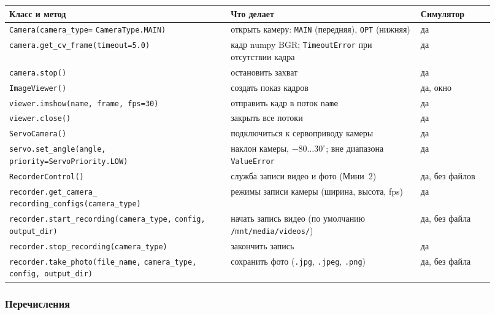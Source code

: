 {\footnotesize
\begin{longtable}{@{}>{\raggedright\arraybackslash}p{0.42\linewidth}>{\raggedright\arraybackslash}p{0.36\linewidth}>{\raggedright\arraybackslash}p{0.14\linewidth}@{}}
\toprule
\textbf{Класс и метод} & \textbf{Что делает} & \textbf{Симулятор} \\
\midrule
\endhead
\verb|Camera(camera_type=| \verb|CameraType.MAIN)| & открыть камеру: \verb|MAIN| (передняя), \verb|OPT| (нижняя) & да \\
\verb|camera.get_cv_frame(timeout=5.0)| & кадр numpy BGR; \verb|TimeoutError| при отсутствии кадра & да \\
\verb|camera.stop()| & остановить захват & да \\
\verb|ImageViewer()| & создать показ кадров & да, окно \\
\verb|viewer.imshow(name, frame, fps=30)| & отправить кадр в поток \verb|name| & да \\
\verb|viewer.close()| & закрыть все потоки & да \\
\verb|ServoCamera()| & подключиться к сервоприводу камеры & да \\
\verb|servo.set_angle(angle,| \verb|priority=ServoPriority.LOW)| & наклон камеры, $-80\ldots30^\circ$; вне диапазона \verb|ValueError| & да \\
\verb|RecorderControl()| & служба записи видео и фото (Мини~2) & да, без файлов \\
\verb|recorder.get_camera_| \verb|recording_configs(camera_type)| & режимы записи камеры (ширина, высота, fps) & да \\
\verb|recorder.start_recording(camera_type,| \verb|config, output_dir)| & начать запись видео (по умолчанию \texttt{/mnt/media/videos/}) & да, без файла \\
\verb|recorder.stop_recording(camera_type)| & закончить запись & да \\
\verb|recorder.take_photo(file_name,| \verb|camera_type, config, output_dir)| & сохранить фото (\texttt{.jpg}, \texttt{.jpeg}, \texttt{.png}) & да, без файла \\
\bottomrule
\end{longtable}
}

\subsubsection*{Перечисления}


